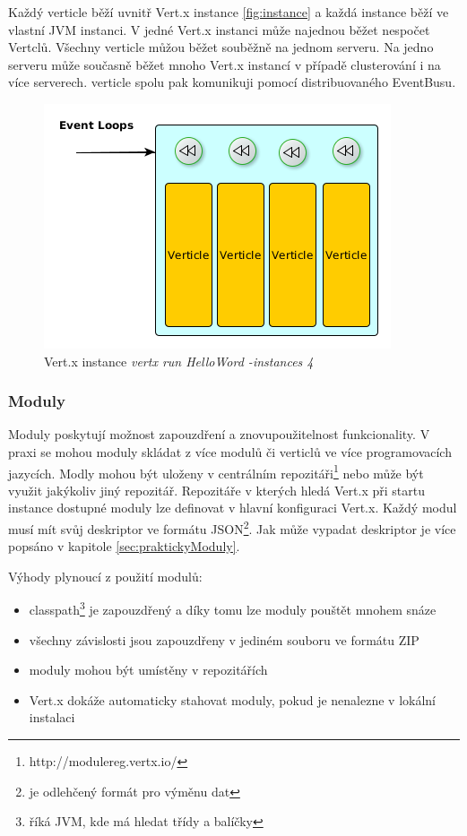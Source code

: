 Každý verticle běží uvnitř Vert.x instance \vref{fig:instance} a každá instance běží ve vlastní JVM instanci. V jedné Vert.x instanci může najednou běžet nespočet Vertclů. Všechny verticle můžou běžet souběžně na jednom serveru. Na jedno serveru může současně běžet mnoho Vert.x instancí v případě clusterování i na více serverech. verticle spolu pak komunikuji pomocí distribuovaného EventBusu.

\begin{figure}
\begin{centering}
\includegraphics[scale=0.5]{obrazky/instance4}
\par\end{centering}
\caption{Vert.x instance \emph{vertx run HelloWord -instances 4} \label{fig:instance4}}
\end{figure}

\subsubsection{Moduly}\label{sub:moduly}

Moduly poskytují možnost zapouzdření a znovupoužitelnost funkcionality. V praxi se mohou moduly skládat z více modulů či verticlů ve více programovacích jazycích. Modly mohou být uloženy v centrálním repozitáři\footnote{http://modulereg.vertx.io/} nebo může být využit jakýkoliv jiný repozitář. Repozitáře v kterých hledá Vert.x při startu instance dostupné moduly lze definovat v hlavní konfiguraci Vert.x. Každý modul musí mít svůj deskriptor ve formátu JSON\footnote{je odlehčený formát pro výměnu dat}. Jak může vypadat deskriptor je více popsáno v kapitole \ref{sec:praktickyModuly}.

Výhody plynoucí z použití modulů:
\begin{itemize}
\item{classpath\footnote{říká JVM, kde má hledat třídy a balíčky} je zapouzdřený a díky tomu lze moduly pouštět mnohem snáze}
\item{všechny závislosti jsou zapouzdřeny v jediném souboru ve formátu ZIP}
\item{moduly mohou být umístěny v repozitářích}
\item{Vert.x dokáže automaticky stahovat moduly, pokud je nenalezne v lokální instalaci}
\end{itemize}

